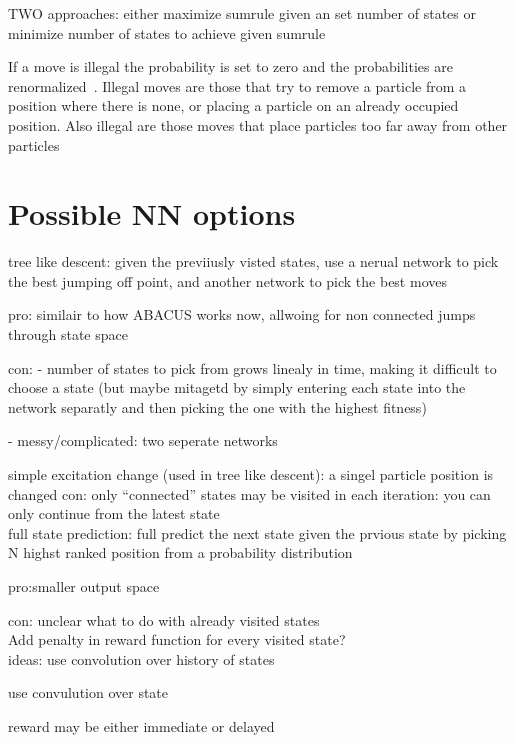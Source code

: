 \documentclass[11pt, a4paper]{report} %
\begin{document}
TWO approaches: either maximize sumrule given an set number of states or minimize number of states to achieve given sumrule


If a move is illegal the probability is set to zero and the probabilities are renormalized~\cite{pmlr-v37-clark15}.
Illegal moves are those that try to remove a particle from a position where there is none, or placing a particle on an already occupied position.
Also illegal are those moves that place particles too far away from other particles 



\section{Possible NN options}

tree like descent: given the previiusly visted states, use a nerual network to pick the best jumping off point, and another network to pick the best moves

pro: similair to how ABACUS works now, allwoing for non connected jumps through state space

con: - number of states to pick from grows linealy in time, making it difficult to choose a state (but maybe mitagetd by simply entering each state into the network separatly and then picking the one with the highest fitness)

- messy/complicated: two seperate networks

simple excitation change (used in tree like descent): a singel particle position is changed
con: only ``connected'' states may be visited in each iteration: you can only continue from the latest state
\\
full state prediction: full predict the next state given the prvious state by picking N highst ranked position from a probability distribution

pro:smaller output space

con: unclear what to do with already visited states
\\
Add penalty in reward function for every visited state?
\\
ideas:
use convolution over history of states

use convulution over state

reward may be either immediate or delayed
\end{document}
